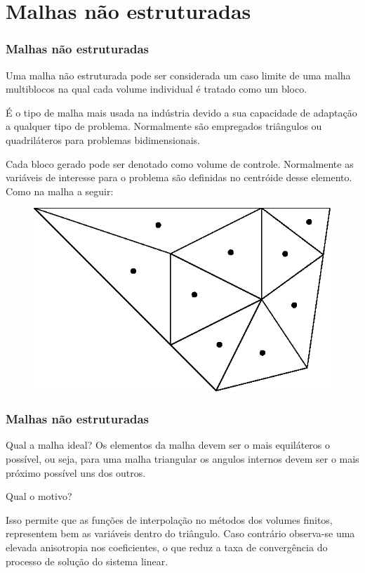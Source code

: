 \documentclass[brazil]{beamer}
\begin{document}
\section{Malhas não estruturadas}
\begin{frame}
  \frametitle{Malhas não estruturadas}
  Uma malha não estruturada pode ser considerada um caso limite de uma malha multiblocos na qual cada volume individual é tratado como um bloco.

  É o tipo de malha mais usada na indústria devido a sua capacidade de adaptação a qualquer tipo de problema. Normalmente são empregados triângulos ou quadriláteros para problemas bidimensionais.

  Cada bloco gerado pode ser denotado como volume de controle. Normalmente as variáveis de interesse para o problema são definidas no centróide desse elemento. Como na malha a seguir:

  \begin{figure}
    \includegraphics[width=0.4\linewidth]{variacao_suave.eps}
  \end{figure}

\end{frame}

\begin{frame}
  \frametitle{Malhas não estruturadas}

  \begin{block}{Qual a malha ideal?}
    Os elementos da malha devem ser o mais equiláteros o possível, ou seja, para uma malha triangular os angulos internos devem ser o mais próximo possível uns dos outros.
  \end{block}

  \begin{block}{Qual o motivo?}

    Isso permite que as funções de interpolação no métodos dos volumes finitos, representem bem as variáveis dentro do triângulo. Caso contrário observa-se uma elevada anisotropia nos coeficientes, o que reduz a taxa de convergência do processo de solução do sistema linear.

  \end{block}

\end{frame}
\end{document}
